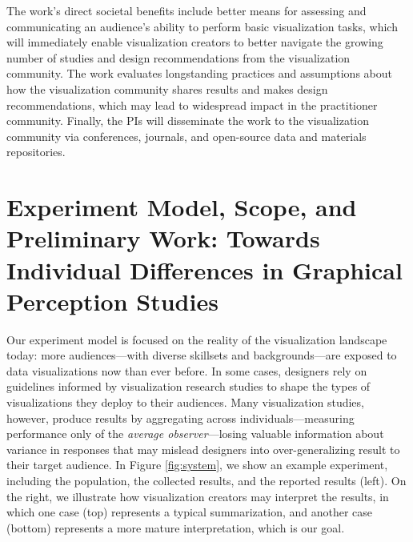 \documentclass[11pt]{article}
\begin{document}
The work's direct societal benefits include better means for assessing and communicating an audience's ability to perform basic visualization tasks, which will immediately enable visualization creators to better navigate the growing number of studies and design recommendations from the visualization community.
The work evaluates longstanding practices and assumptions about how the visualization community shares results and makes design recommendations, which may lead to widespread impact in the practitioner community.
Finally, the PIs will disseminate the work to the visualization community via conferences, journals, and open-source data and materials repositories.

\section{Experiment Model, Scope, and Preliminary Work: Towards Individual Differences in Graphical Perception Studies}
Our experiment model is focused on the reality of the visualization landscape today: more audiences---with diverse skillsets and backgrounds---are exposed to data visualizations now than ever before.
In some cases, designers rely on guidelines informed by visualization research studies to shape the types of visualizations they deploy to their audiences.
Many visualization studies, however, produce results by aggregating across individuals---measuring performance only of the \emph{average observer}---losing valuable information about variance in responses that may mislead designers into over-generalizing result to their target audience.
In Figure \ref{fig:system}, we show an example experiment, including the population, the collected results, and the reported results (left).
On the right, we illustrate how visualization creators may interpret the results, in which one case (top) represents a typical summarization, and another case (bottom) represents a more mature interpretation, which is our goal.

\figsystem
\end{document}
